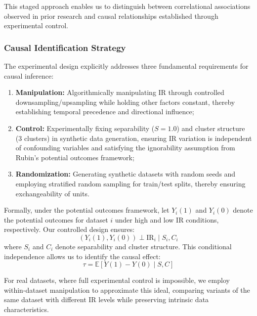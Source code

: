 \documentclass{ijSmartGrid}
\theoremstyle{definition}
\begin{document}
\indent This staged approach enables us to distinguish between correlational associations observed in prior research and causal relationships established through experimental control.

\subsubsection{Causal Identification Strategy}
\indent The experimental design explicitly addresses three fundamental requirements for causal inference:

\begin{enumerate}
    \item \textbf{Manipulation:} Algorithmically manipulating IR through controlled downsampling/upsampling while holding other factors constant, thereby establishing temporal precedence and directional influence;
    
    \item \textbf{Control:} Experimentally fixing separability ($S=1.0$) and cluster structure (3 clusters) in synthetic data generation, ensuring IR variation is independent of confounding variables and satisfying the ignorability assumption from Rubin's potential outcomes framework;
    
    \item \textbf{Randomization:} Generating synthetic datasets with random seeds and employing stratified random sampling for train/test splits, thereby ensuring exchangeability of units.
\end{enumerate}

\indent Formally, under the potential outcomes framework, let $Y_i(1)$ and $Y_i(0)$ denote the potential outcomes for dataset $i$ under high and low IR conditions, respectively. Our controlled design ensures:
\begin{equation}
(Y_i(1), Y_i(0)) \perp \text{IR}_i \mid S_i, C_i
\end{equation}
where $S_i$ and $C_i$ denote separability and cluster structure. This conditional independence allows us to identify the causal effect:
\begin{equation}
\tau = \mathbb{E}[Y(1) - Y(0) \mid S, C]
\end{equation}

For real datasets, where full experimental control is impossible, we employ within-dataset manipulation to approximate this ideal, comparing variants of the same dataset with different IR levels while preserving intrinsic data characteristics.
\end{document}
